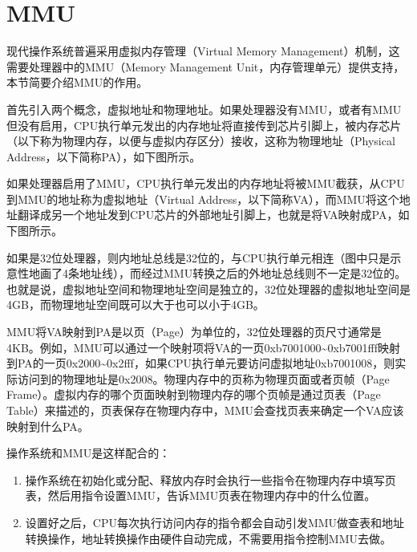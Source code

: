 
\section{MMU}
%
现代操作系统普遍采用虚拟内存管理（Virtual Memory Management）机制，这需要处理器中的MMU（Memory Management Unit，内存管理单元）提供支持，本节简要介绍MMU的作用。



首先引入两个概念，虚拟地址和物理地址。如果处理器没有MMU，或者有MMU但没有启用，CPU执行单元发出的内存地址将直接传到芯片引脚上，被内存芯片（以下称为物理内存，以便与虚拟内存区分）接收，这称为物理地址（Physical Address，以下简称PA），如下图所示。




如果处理器启用了MMU，CPU执行单元发出的内存地址将被MMU截获，从CPU到MMU的地址称为虚拟地址（Virtual Address，以下简称VA），而MMU将这个地址翻译成另一个地址发到CPU芯片的外部地址引脚上，也就是将VA映射成PA，如下图所示。




如果是32位处理器，则内地址总线是32位的，与CPU执行单元相连（图中只是示意性地画了4条地址线），而经过MMU转换之后的外地址总线则不一定是32位的。也就是说，虚拟地址空间和物理地址空间是独立的，32位处理器的虚拟地址空间是4GB，而物理地址空间既可以大于也可以小于4GB。



MMU将VA映射到PA是以页（Page）为单位的，32位处理器的页尺寸通常是4KB。例如，MMU可以通过一个映射项将VA的一页0xb7001000\textasciitilde{}\BookSplit{}0xb7001fff映射到PA的一页0x2000\textasciitilde{}\BookSplit{}0x2fff，如果CPU执行单元要访问虚拟地址0xb7001008，则实际访问到的物理地址是0x2008。物理内存中的页称为物理页面或者页帧（Page Frame）。虚拟内存的哪个页面映射到物理内存的哪个页帧是通过页表（Page Table）来描述的，页表保存在物理内存中，MMU会查找页表来确定一个VA应该映射到什么PA。



操作系统和MMU是这样配合的：


\begin{enumerate}

\item 操作系统在初始化或分配、释放内存时会执行一些指令在物理内存中填写页表，然后用指令设置MMU，告诉MMU页表在物理内存中的什么位置。

\item 设置好之后，CPU每次执行访问内存的指令都会自动引发MMU做查表和地址转换操作，地址转换操作由硬件自动完成，不需要用指令控制MMU去做。
\end{enumerate}


